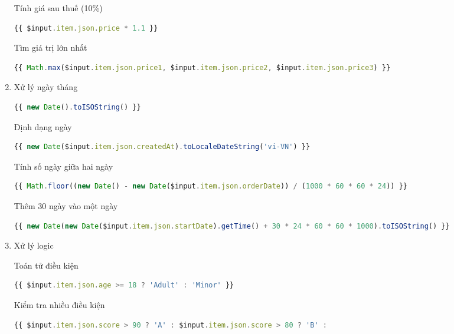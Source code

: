\begin{enumerate}
Tính giá sau thuế (10\%)
\begin{lstlisting}[language = Javascript]
{{ $input.item.json.price * 1.1 }}
\end{lstlisting}

Tìm giá trị lớn nhất
\begin{lstlisting}[language = Javascript]
{{ Math.max($input.item.json.price1, $input.item.json.price2, $input.item.json.price3) }}
\end{lstlisting}
\item Xử lý ngày tháng
\begin{lstlisting}[language = Javascript]
{{ new Date().toISOString() }}

\end{lstlisting}

Định dạng ngày
\begin{lstlisting}[language = Javascript]
{{ new Date($input.item.json.createdAt).toLocaleDateString('vi-VN') }}
\end{lstlisting}

Tính số ngày giữa hai ngày
\begin{lstlisting}[language = Javascript]
{{ Math.floor((new Date() - new Date($input.item.json.orderDate)) / (1000 * 60 * 60 * 24)) }}
\end{lstlisting}

Thêm 30 ngày vào một ngày
\begin{lstlisting}[language = Javascript]
{{ new Date(new Date($input.item.json.startDate).getTime() + 30 * 24 * 60 * 60 * 1000).toISOString() }}
\end{lstlisting}
\item Xử lý logic

Toán tử điều kiện
\begin{lstlisting}[language = Javascript]
{{ $input.item.json.age >= 18 ? 'Adult' : 'Minor' }}
\end{lstlisting}

Kiểm tra nhiều điều kiện
\begin{lstlisting}[language = Javascript]
{{ $input.item.json.score > 90 ? 'A' : $input.item.json.score > 80 ? 'B' :
\end{lstlisting}
\end{enumerate}
